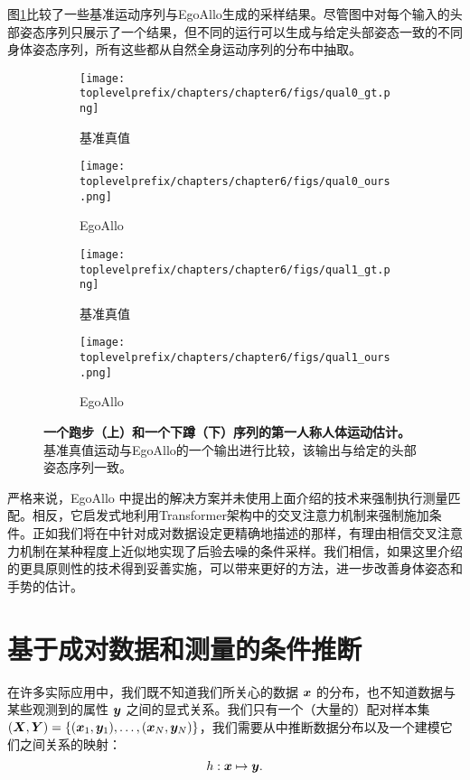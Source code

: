 \documentclass[../../book-main_zh.tex]{subfiles}
\begin{document}
图\ref{fig:comparison}比较了一些基准运动序列与EgoAllo生成的采样结果。尽管图中对每个输入的头部姿态序列只展示了一个结果，但不同的运行可以生成与给定头部姿态一致的不同身体姿态序列，所有这些都从自然全身运动序列的分布中抽取。
\begin{figure}[t]
\centering
\begin{subfigure}{0.45\textwidth}
  \centering
  \texttt{[image: \\toplevelprefix/chapters/chapter6/figs/qual0\_gt.png]}
  \caption{\centering 基准真值}
\end{subfigure}
\hfill
\begin{subfigure}{0.45\textwidth}
  \centering
  \texttt{[image: \\toplevelprefix/chapters/chapter6/figs/qual0\_ours.png]}
  \caption{EgoAllo}
\end{subfigure}

\begin{subfigure}{0.45\textwidth}
  \centering
  \texttt{[image: \\toplevelprefix/chapters/chapter6/figs/qual1\_gt.png]}
  \caption{\centering 基准真值}
\end{subfigure}
\hfill
\begin{subfigure}{0.45\textwidth}
  \centering
  \texttt{[image: \\toplevelprefix/chapters/chapter6/figs/qual1\_ours.png]}
  \caption{EgoAllo}
\end{subfigure}

\caption{
\textbf{一个跑步（上）和一个下蹲（下）序列的第一人称人体运动估计。}
基准真值运动与EgoAllo的一个输出进行比较，该输出与给定的头部姿态序列一致。
}
\label{fig:comparison}
\end{figure}

严格来说，EgoAllo \cite{yi2024egoallo}中提出的解决方案并未使用上面介绍的技术来强制执行测量匹配。相反，它启发式地利用Transformer架构中的交叉注意力机制来强制施加条件。正如我们将在中针对成对数据设定更精确地描述的那样，有理由相信交叉注意力机制在某种程度上近似地实现了后验去噪的条件采样。我们相信，如果这里介绍的更具原则性的技术得到妥善实施，可以带来更好的方法，进一步改善身体姿态和手势的估计。

\section{基于成对数据和测量的条件推断}
在许多实际应用中，我们既不知道我们所关心的数据 $\bm{x}$ 的分布，也不知道数据与某些观测到的属性 $\bm{y}$ 之间的显式关系。我们只有一个（大量的）配对样本集 $(\bm{X}, \bm{Y}) = \{ (\bm{x}_1, \bm{y}_1), \ldots, (\bm{x}_N, \bm{y}_N) \}$，我们需要从中推断数据分布以及一个建模它们之间关系的映射：
\begin{equation}
  h: \bm{x} \mapsto \bm{y}.
\end{equation}
\end{document}
